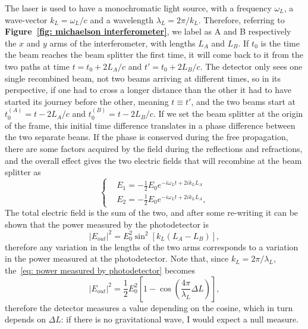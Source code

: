 The laser is used to have a monochromatic light source, with a frequency $\omega_L$, a wave-vector $k_L=\omega_L/c$ and a wavelength $\lambda_L = 2\pi/k_L$.
Therefore, referring to \textbf{Figure~\ref{fig: michaelson interferometer}}, we label as A and B respectively the $x$ and $y$ arms of the interferometer, with lengths $L_A$ and $L_B$.
If $t_0$ is the time the beam reaches the beam splitter the first time, it will come back to it from the two paths at time $t = t_0 + 2L_{A}/c$ and $t'= t_0 + 2L_B/c$.
The detector only sees one single recombined beam, not two beams arriving at different times, so in its perspective, if one had to cross a longer distance than the other it had to have started its journey before the other, meaning $t\equiv t'$, and the two beams start at $t_0^{(A)} = t - 2L_A/c$ and $t_0^{(B)} = t - 2L_B/c$.
If we set the beam splitter at the origin of the frame, this initial time difference translates in a phase difference between the two separate beans. 
If the phase is conserved during the free propagation, there are some factors acquired by the field during the reflections and refractions, and the overall effect gives the two electric fields that will recombine at the beam splitter as
\begin{equation}
    \left\{
        \begin{aligned}
            &E_1 = -\frac{1}{2}E_0e^{-i\omega_Lt + 2ik_LL_A} \\
            &E_2 = -\frac{1}{2}E_0e^{-i\omega_Lt + 2ik_LL_A},
        \end{aligned}
    \right.
    \label{eq: fields in arms of michaelson}
\end{equation}
The total electric field is the sum of the two, and after some re-writing it can be shown that the power measured by the photodetector is 
\begin{equation}
    |E_{out}|^2 = E_0^2 \sin^2[k_L(L_A-L_B)],
    \label{eq: power measured by photodetector}
\end{equation}
therefore any variation in the lengths of the two arms corresponds to a variation in the power measured at the photodetector.
Note that, since $k_L=2\pi/\lambda_L$, the~\eqref{eq: power measured by photodetector} becomes
\begin{equation*}
    |E_{out}|^2 = \frac{1}{2} E_0^2 \left[1-\cos{\left(\frac{4\pi}{\lambda_L}\Delta L\right)}\right],
\end{equation*}
therefore the detector measures a value depending on the cosine, which in turn depends on $\Delta L$: if there is no gravitational wave, I would expect a null measure.

